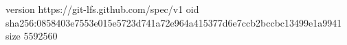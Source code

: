 version https://git-lfs.github.com/spec/v1
oid sha256:0858403e7553e015e5723d741a72e964a415377d6e7ccb2bccbc13499e1a9941
size 5592560
